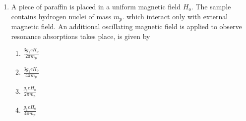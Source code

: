 \documentclass[journal]{IEEEtran}
\begin{document}
\begin{enumerate}
\begin{enumerate}
\end{enumerate}
\item A piece of paraffin is placed in a uniform magnetic field $H_o$. The sample contains hydrogen nuclei of mass $m_p$. which interact only with external magnetic field. An additional oscillating magnetic field is applied to observe resonance absorptions takes place, is given by
\begin{enumerate}
    \item $\frac{3g_1 eH_o}{2\pi m_p}$
    \item $\frac{3g_1 eH_o}{4\pi m_p}$
    \item $\frac{g_1 eH_o}{2\pi m_p}$
    \item $\frac{g_1 eH_o}{4\pi m_p}$
\end{enumerate}
\end{enumerate}
\end{document}
